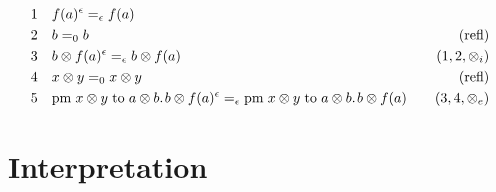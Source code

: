 \begin{equation*}
  \begin{split}
  1 \hspace{10 pt} & f(a)^{\epsilon} =_{\epsilon} f(a) \\
  2 \hspace{10 pt} &  b =_{0} b & {(\text{refl})} \\
  3 \hspace{10 pt} & b \otimes f(a)^{\epsilon}  =_{\epsilon} b \otimes f(a)  & \text{($1,2,\otimes_i$)} \\
  4 \hspace{10 pt} &   x \otimes y =_{0}  x \otimes y  &{(\text{refl})}  \\
  5\hspace{10 pt}& \text{pm} \hspace{3 pt} x \otimes y\hspace{3 pt} \text{to} \hspace{3 pt} a \otimes b. \hspace{1pt} b \otimes f(a)^{\epsilon} =_{\epsilon} \text{pm} \hspace{3 pt} x \otimes y\hspace{3 pt} \text{to} \hspace{3 pt} a \otimes b. \hspace{1pt} b \otimes f(a) & \hspace{10pt} \text{($3,4,\otimes_e$)}
  \end{split}
  \end{equation*}







































\section{Interpretation} \label{sec:Quantum Lambda Calculus:Interpretation}

